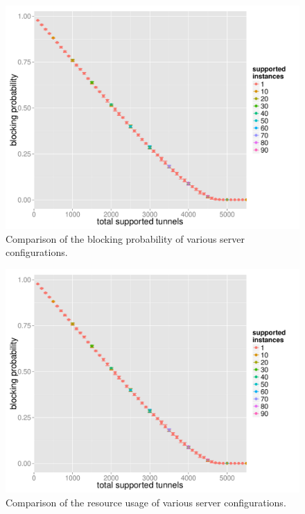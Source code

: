 \begin{figure}[htb]
  \centering
  \includegraphics[width=1.0\textwidth]{images/feasiblemultiserver-blockprob.pdf}
  \caption{Comparison of the blocking probability of various server configurations.}
 \label{c4:fig:blockprob-multiserver}
\end{figure}

\begin{figure}[htb]
  \centering
  \includegraphics[width=1.0\textwidth]{images/feasiblemultiserver-blockprob.pdf}
  \caption{Comparison of the resource usage of various server configurations.}
 \label{c4:fig:res-usage-multiserver}
\end{figure}

